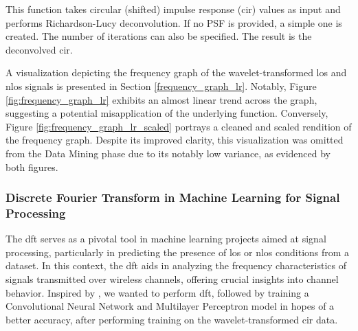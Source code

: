 This function takes circular (shifted) impulse response (\acrshort{cir}) values as input and performs Richardson-Lucy deconvolution. If no PSF is provided, a simple one is created. The number of iterations can also be specified. The result is the deconvolved \acrshort{cir}.

A visualization depicting the frequency graph of the wavelet-transformed \acrshort{los} and \acrshort{nlos} signals is presented in Section \ref{frequency_graph_lr}. Notably, Figure \ref{fig:frequency_graph_lr} exhibits an almost linear trend across the graph, suggesting a potential misapplication of the underlying function. Conversely, Figure \ref{fig:frequency_graph_lr_scaled} portrays a cleaned and scaled rendition of the frequency graph. Despite its improved clarity, this visualization was omitted from the Data Mining phase due to its notably low variance, as evidenced by both figures.

\subsubsection{\Gls{Discrete Fourier Transform} in Machine Learning for Signal Processing}

The \acrshort{dft} serves as a pivotal tool in machine learning projects aimed at signal processing, particularly in predicting the presence of \acrshort{los} or \acrshort{nlos} conditions from a dataset. In this context, the \acrshort{dft} aids in analyzing the frequency characteristics of signals transmitted over wireless channels, offering crucial insights into channel behavior. Inspired by \cite{8682194}, we wanted to perform \acrshort{dft}, followed by training a \Gls{Convolutional Neural Network} and \Gls{Multilayer Perceptron} model in hopes of a better accuracy, after performing training on the wavelet-transformed \acrshort{cir} data.

